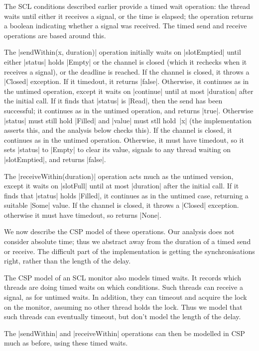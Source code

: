 The SCL conditions described earlier provide a timed wait operation: the
thread waits until either it receives a signal, or the time is elapsed; the
operation returns a boolean indicating whether a signal was received.  The
timed send and receive operations are based around this. 

The |sendWithin(x, duration)| operation initially waits on |slotEmptied| until
either |status| holds |Empty| or the channel is closed (which it rechecks when
it receives a signal), or the deadline is reached.  If the channel is closed,
it throws a |Closed| exception.  If it timedout, it returns |false|.
Otherwise, it continues as in the untimed operation, except it waits on
|continue| until at most |duration| after the initial call.  If it finds that
|status| is |Read|, then the send has been successful; it continues as in the
untimed operation, and returns |true|.  Otherwise |status| must still hold
|Filled| and |value| must stll hold~|x| (the implementation asserts this, and
the analysis below checks this).  If the channel is closed, it continues as in
the untimed operation.  Otherwise, it must have timedout, so it sets |status|
to |Empty| to clear its value, signals to any thread waiting on |slotEmptied|,
and returns |false|.

The |receiveWithin(duration)| operation acts much as the untimed version,
except it waits on |slotFull| until at most |duration| after the initial
call.  If it finds that |status| holds |Filled|, it continues as in the
untimed case, returning a suitable |Some| value.  If the channel is closed, it
throws a |Closed| exception.  otherwise it must have timedout, so returns
|None|.  


We now describe the CSP model of these operations.  Our analysis does not
consider absolute time; thus we abstract away from the duration of a timed
send or receive.  The difficult part of the implementation is getting the
synchronisations right, rather than the length of the delay. 

The CSP model of an SCL monitor also models timed waits.  It records which
threads are doing timed waits on which conditions.  Such threads can receive a
signal, as for untimed waits.  In addition, they can timeout and acquire the
lock on the monitor, assuming no other thread holds the lock.  Thus we model
that such threads can eventually timeout, but don't model the length of the
delay. 

The |sendWithin| and |receiveWithin| operations can then be modelled in CSP
much as before, using these timed waits.


